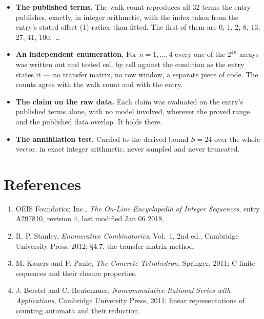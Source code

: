 \documentclass[11pt]{article}
\theoremstyle{definition}
\begin{document}
\begin{itemize}

\item {\bfseries The published terms.} The walk count reproduces all 32 terms the entry publishes, exactly, in integer arithmetic, with the index taken from the entry's stated offset (1) rather than fitted. The first of them are 0, 1, 2, 8, 13, 27, 41, 100,~\dots

\item {\bfseries An independent enumeration.} For $n = 1,\dots,4$ every one of the $2^{4n}$ arrays was written out and tested cell by cell against the condition as the entry states it --- no transfer matrix, no row window, a separate piece of code. The counts agree with the walk count and with the entry.

\item {\bfseries The claim on the raw data.} Each claim was evaluated on the entry's published terms alone, with no model involved, wherever the proved range and the published data overlap. It holds there.

\item {\bfseries The annihilation test.} Carried to the derived bound $S = 24$ over the whole vector, in exact integer arithmetic, never sampled and never truncated.

\end{itemize}

\section{References}

\begin{enumerate}

\item OEIS Foundation Inc., \emph{The On-Line Encyclopedia of Integer Sequences}, entry \href{https://oeis.org/A297810}{A297810}, revision 4, last modified Jan 06 2018.

\item R. P. Stanley, \emph{Enumerative Combinatorics}, Vol.~1, 2nd ed., Cambridge University Press, 2012; \S4.7, the transfer-matrix method.

\item M. Kauers and P. Paule, \emph{The Concrete Tetrahedron}, Springer, 2011; C-finite sequences and their closure properties.

\item J. Berstel and C. Reutenauer, \emph{Noncommutative Rational Series with Applications}, Cambridge University Press, 2011; linear representations of counting automata and their reduction.

\end{enumerate}
\end{document}
